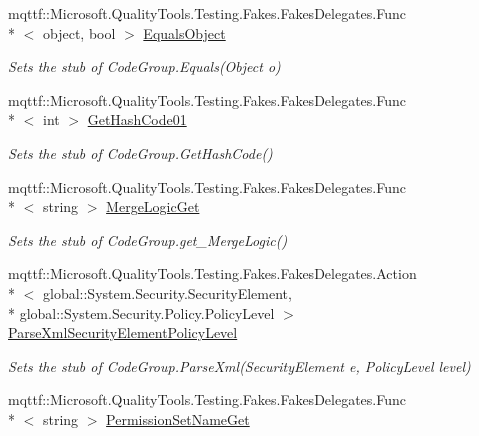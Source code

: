 \begin{DoxyCompactItemize}
mqttf\-::\-Microsoft.\-Quality\-Tools.\-Testing.\-Fakes.\-Fakes\-Delegates.\-Func\\*
$<$ object, bool $>$ \hyperlink{class_system_1_1_security_1_1_policy_1_1_fakes_1_1_stub_code_group_a21b2d0b399480c4837e411ccfada8595}{Equals\-Object}
\begin{DoxyCompactList}\small\item\em Sets the stub of Code\-Group.\-Equals(\-Object o)\end{DoxyCompactList}\item 
mqttf\-::\-Microsoft.\-Quality\-Tools.\-Testing.\-Fakes.\-Fakes\-Delegates.\-Func\\*
$<$ int $>$ \hyperlink{class_system_1_1_security_1_1_policy_1_1_fakes_1_1_stub_code_group_ab41317a07ca4e78e6dfd066e09ffd0a5}{Get\-Hash\-Code01}
\begin{DoxyCompactList}\small\item\em Sets the stub of Code\-Group.\-Get\-Hash\-Code()\end{DoxyCompactList}\item 
mqttf\-::\-Microsoft.\-Quality\-Tools.\-Testing.\-Fakes.\-Fakes\-Delegates.\-Func\\*
$<$ string $>$ \hyperlink{class_system_1_1_security_1_1_policy_1_1_fakes_1_1_stub_code_group_ace495e5d87ff648cc3973fa25d15f6ec}{Merge\-Logic\-Get}
\begin{DoxyCompactList}\small\item\em Sets the stub of Code\-Group.\-get\-\_\-\-Merge\-Logic()\end{DoxyCompactList}\item 
mqttf\-::\-Microsoft.\-Quality\-Tools.\-Testing.\-Fakes.\-Fakes\-Delegates.\-Action\\*
$<$ global\-::\-System.\-Security.\-Security\-Element, \\*
global\-::\-System.\-Security.\-Policy.\-Policy\-Level $>$ \hyperlink{class_system_1_1_security_1_1_policy_1_1_fakes_1_1_stub_code_group_a71e9b704f10747076f6672e9ab1f397c}{Parse\-Xml\-Security\-Element\-Policy\-Level}
\begin{DoxyCompactList}\small\item\em Sets the stub of Code\-Group.\-Parse\-Xml(\-Security\-Element e, Policy\-Level level)\end{DoxyCompactList}\item 
mqttf\-::\-Microsoft.\-Quality\-Tools.\-Testing.\-Fakes.\-Fakes\-Delegates.\-Func\\*
$<$ string $>$ \hyperlink{class_system_1_1_security_1_1_policy_1_1_fakes_1_1_stub_code_group_a32eefe0d7c0e7c6b31cc83e0e0996770}{Permission\-Set\-Name\-Get}

\end{DoxyCompactItemize}
